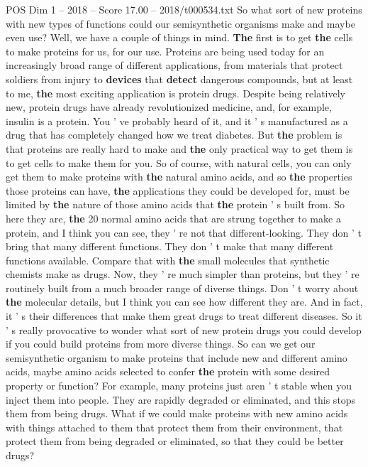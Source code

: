 \begin{textsample}{POS Dim 1 – 2018 – Score 17.00 – 2018/t000534.txt}
So what sort of new proteins with new types of functions could our semisynthetic organisms make and maybe even use?
Well, we have a couple of things in mind. \textbf{The} first is to get \textbf{the} cells to make proteins for us, for our use.
Proteins are being used today for an increasingly broad range of different applications, from materials that protect soldiers from injury to \textbf{devices} that \textbf{detect} dangerous compounds, but at least to me, \textbf{the} most exciting application is protein drugs.
Despite being relatively new, protein drugs have already revolutionized medicine, and, for example, insulin is a protein.
You ' ve probably heard of it, and it ' s manufactured as a drug that has completely changed how we treat diabetes.
But \textbf{the} problem is that proteins are really hard to make and \textbf{the} only practical way to get them is to get cells to make them for you.
So of course, with natural cells, you can only get them to make proteins with \textbf{the} natural amino acids, and so \textbf{the} properties those proteins can have, \textbf{the} applications they could be developed for, must be limited by \textbf{the} nature of those amino acids that \textbf{the} protein ' s built from.
So here they are, \textbf{the} 20 normal amino acids that are strung together to make a protein, and I think you can see, they ' re not that different-looking.
They don ' t bring that many different functions.
They don ' t make that many different functions available.
Compare that with \textbf{the} small molecules that synthetic chemists make as drugs.
Now, they ' re much simpler than proteins, but they ' re routinely built from a much broader range of diverse things.
Don ' t worry about \textbf{the} molecular details, but I think you can see how different they are.
And in fact, it ' s their differences that make them great drugs to treat different diseases.
So it ' s really provocative to wonder what sort of new protein drugs you could develop if you could build proteins from more diverse things.
So can we get our semisynthetic organism to make proteins that include new and different amino acids, maybe amino acids selected to confer \textbf{the} protein with some desired property or function?
For example, many proteins just aren ' t stable when you inject them into people.
They are rapidly degraded or eliminated, and this stops them from being drugs.
What if we could make proteins with new amino acids with things attached to them that protect them from their environment, that protect them from being degraded or eliminated, so that they could be better drugs?

\end{textsample}
